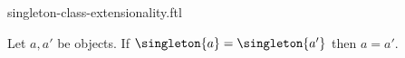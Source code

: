 \documentclass{article}
\begin{document}
\begin{smodule}[creators={Marcel Schütz}]{singleton-class-extensionality.ftl}

  \begin{fproposition*}[label=6954678910713856]
    Let $a, a'$ be objects.
    If $\singleton{a} = \singleton{a'}$ then $a = a'$.
  \end{fproposition*}
\end{smodule}
\end{document}
